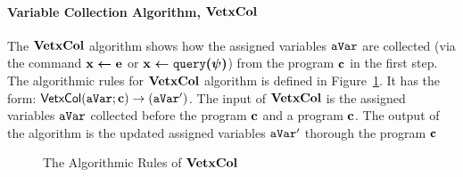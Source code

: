 \documentclass[a4paper,11pt]{article}
\begin{document}
\paragraph{Variable Collection Algorithm, $\bf{VetxCol}$}
The $\bf{VetxCol}$ algorithm shows how the assigned variables $\mathtt{aVar}$ are collected 
(via the command $\boldsymbol{\mathbf{\mathrel{ x \leftarrow e }}}$ or $\boldsymbol{\mathbf{\mathrel{ x \leftarrow {\tt query}(\psi) }}}$) from the program $\boldsymbol{\mathbf{c}}$ in the first step.
The algorithmic rules for $\bf{VetxCol}$ algorithm is defined in Figure~\ref{fig:var_col}. 
It has the form: $\mathsf{VetxCol}{(\mathtt{aVar}; \boldsymbol{\mathbf{c}})}\to {( \ensuremath{\mathtt{aVar}}')} $. 
The input of $\bf{VetxCol}$ is the assigned variables $\mathtt{aVar}$ collected before the program $\boldsymbol{\mathbf{c}}$ and a program $\boldsymbol{\mathbf{c}}$. 
The output of the algorithm is the updated assigned variables $\mathtt{aVar}'$ thorough the program $\boldsymbol{\mathbf{c}}$
%
%
\begin{figure}
 \caption{The Algorithmic Rules of $\bf{VetxCol}$ }
    \label{fig:var_col}
\end{figure}
%
\end{document}
